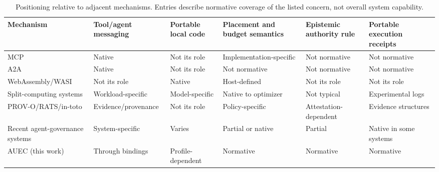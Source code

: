 \begin{table}[!t]
\caption{Positioning relative to adjacent mechanisms. Entries describe normative coverage of the listed concern, not overall system capability.}
\label{tab:positioning}
\centering
\scriptsize
\begin{tabularx}{\textwidth}{@{}p{}YYYYY@{}}
\toprule
Mechanism & Tool/agent messaging & Portable local code & Placement and budget semantics & Epistemic authority rule & Portable execution receipts \\
\midrule
MCP & Native & Not its role & Implementation-specific & Not normative & Not normative \\
A2A & Native & Not its role & Not normative & Not normative & Not normative \\
WebAssembly/WASI & Not its role & Native & Host-defined & Not its role & Not its role \\
Split-computing systems & Workload-specific & Model-specific & Native to optimizer & Not typical & Experimental logs \\
PROV-O/RATS/in-toto & Evidence/provenance & Not its role & Policy-specific & Attestation-dependent & Evidence structures \\
Recent agent-governance systems & System-specific & Varies & Partial or native & Partial & Native in some systems \\
AUEC (this work) & Through bindings & Profile-dependent & Normative & Normative & Normative \\
\bottomrule
\end{tabularx}
\end{table}
